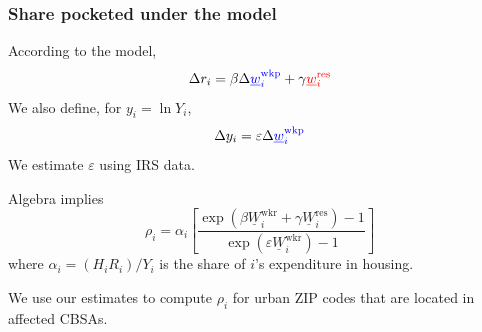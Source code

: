 \documentclass[aspectratio=169, t]{beamer}
\newcommand{\MW}{\underline{W}}
\newcommand{\mw}{\underline{w}}
\newcommand{\wkp}{\text{wkp}}
\newcommand{\res}{\text{res}}
\begin{document}
\begin{frame}[label = share_pocketed_model]
    \frametitle{Share pocketed under the model}

    According to the model,
    $$
    \Delta r_i = \beta \Delta {\color{blue}\mw_i^{\wkp}} + \gamma {\color{red}\mw_i^{\res}}
    $$
    We also define, for $y_i = \ln Y_i$,
    $$
    \Delta y_i = \varepsilon \Delta {\color{blue}\mw_i^{\wkp}}
    $$
    We estimate $\varepsilon$ using IRS data. \hyperlink{wages_results}{}

    \pause
    \vspace{3mm}
    Algebra implies
    \begin{equation*}
        \rho_i = \alpha_i \left[
                  \frac{\exp \left( \beta \MW_i^{\text{wkr}} + \gamma \MW_i^{\text{res}} \right) - 1 }
                       {\exp \left( \varepsilon \MW_i^{\text{wkr}} \right) - 1 }
                         \right]
    \end{equation*}
    where $\alpha_i = \left(H_i R_i\right)/Y_i$ is the share of $i$'s expenditure in housing.

    \vspace{3mm}
    We use our estimates to compute $\rho_i$ for urban ZIP codes that are located
    in affected CBSAs.
\end{frame}
\end{document}
